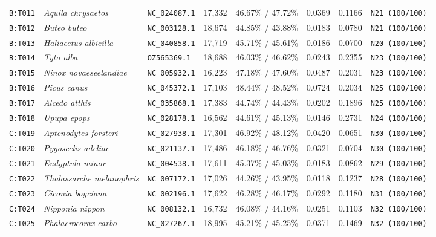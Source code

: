 \documentclass[10pt,letterpaper]{article}
\begin{document}
\begin{longtable}{llllllll}
\texttt{B:T011} & \textit{Aquila chrysaetos} & \texttt{NC\_024087.1} & 17,332 & 46.67\% / 47.72\% & 0.0369 & 0.1166 & \texttt{N21 (100/100)} \\
\texttt{B:T012} & \textit{Buteo buteo} & \texttt{NC\_003128.1} & 18,674 & 44.85\% / 43.88\% & 0.0183 & 0.0780 & \texttt{N21 (100/100)} \\
\texttt{B:T013} & \textit{Haliaeetus albicilla} & \texttt{NC\_040858.1} & 17,719 & 45.71\% / 45.61\% & 0.0186 & 0.0700 & \texttt{N20 (100/100)} \\
\texttt{B:T014} & \textit{Tyto alba} & \texttt{OZ565369.1} & 18,688 & 46.03\% / 46.62\% & 0.0243 & 0.2355 & \texttt{N23 (100/100)} \\
\texttt{B:T015} & \textit{Ninox novaeseelandiae} & \texttt{NC\_005932.1} & 16,223 & 47.18\% / 47.60\% & 0.0487 & 0.2031 & \texttt{N23 (100/100)} \\
\texttt{B:T016} & \textit{Picus canus} & \texttt{NC\_045372.1} & 17,103 & 48.44\% / 48.52\% & 0.0724 & 0.2034 & \texttt{N25 (100/100)} \\
\texttt{B:T017} & \textit{Alcedo atthis} & \texttt{NC\_035868.1} & 17,383 & 44.74\% / 44.43\% & 0.0202 & 0.1896 & \texttt{N25 (100/100)} \\
\texttt{B:T018} & \textit{Upupa epops} & \texttt{NC\_028178.1} & 16,562 & 44.61\% / 45.13\% & 0.0146 & 0.2731 & \texttt{N24 (100/100)} \\
\texttt{C:T019} & \textit{Aptenodytes forsteri} & \texttt{NC\_027938.1} & 17,301 & 46.92\% / 48.12\% & 0.0420 & 0.0651 & \texttt{N30 (100/100)} \\
\texttt{C:T020} & \textit{Pygoscelis adeliae} & \texttt{NC\_021137.1} & 17,486 & 46.18\% / 46.76\% & 0.0321 & 0.0704 & \texttt{N30 (100/100)} \\
\texttt{C:T021} & \textit{Eudyptula minor} & \texttt{NC\_004538.1} & 17,611 & 45.37\% / 45.03\% & 0.0183 & 0.0862 & \texttt{N29 (100/100)} \\
\texttt{C:T022} & \textit{Thalassarche melanophris} & \texttt{NC\_007172.1} & 17,026 & 44.26\% / 43.95\% & 0.0118 & 0.1237 & \texttt{N28 (100/100)} \\
\texttt{C:T023} & \textit{Ciconia boyciana} & \texttt{NC\_002196.1} & 17,622 & 46.28\% / 46.17\% & 0.0292 & 0.1180 & \texttt{N31 (100/100)} \\
\texttt{C:T024} & \textit{Nipponia nippon} & \texttt{NC\_008132.1} & 16,732 & 46.08\% / 44.16\% & 0.0251 & 0.1103 & \texttt{N32 (100/100)} \\
\texttt{C:T025} & \textit{Phalacrocorax carbo} & \texttt{NC\_027267.1} & 18,995 & 45.21\% / 45.25\% & 0.0371 & 0.1469 & \texttt{N32 (100/100)} \\

\end{longtable}
\end{document}
